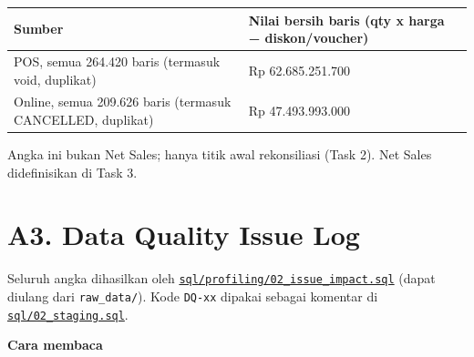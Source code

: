 \documentclass[10pt,a4paper]{article}
\begin{document}
{\def\LTcaptype{none} %
\begin{longtable}[]{@{}
  >{\raggedright\arraybackslash}p{}
  >{\raggedleft\arraybackslash}p{}@{}}
\toprule\noalign{}
\begin{minipage}[b]{\linewidth}\raggedright
Sumber
\end{minipage} & \begin{minipage}[b]{\linewidth}\raggedleft
Nilai bersih baris (qty x harga − diskon/voucher)
\end{minipage} \\
\midrule\noalign{}
\endhead
\bottomrule\noalign{}
\endlastfoot
POS, semua 264.420 baris (termasuk void, duplikat) & Rp 62.685.251.700 \\
Online, semua 209.626 baris (termasuk CANCELLED, duplikat) & Rp 47.493.993.000 \\
\end{longtable}
}

Angka ini bukan Net Sales; hanya titik awal rekonsiliasi (Task 2). Net Sales didefinisikan di Task 3.

\section{A3. Data Quality Issue Log}\label{a3.-data-quality-issue-log}

Seluruh angka dihasilkan oleh \href{https://github.com/titan2903/kirana-omnichannel-performance-intelligence/blob/master/sql/profiling/02_issue_impact.sql}{\texttt{sql/profiling/02\_\allowbreak{}issue\_\allowbreak{}impact.sql}} (dapat diulang dari \texttt{raw\_\allowbreak{}data/}).
Kode \texttt{DQ-xx} dipakai sebagai komentar di \href{https://github.com/titan2903/kirana-omnichannel-performance-intelligence/blob/master/sql/02_staging.sql}{\texttt{sql/02\_\allowbreak{}staging.sql}}.

\textbf{Cara membaca}
\end{document}
